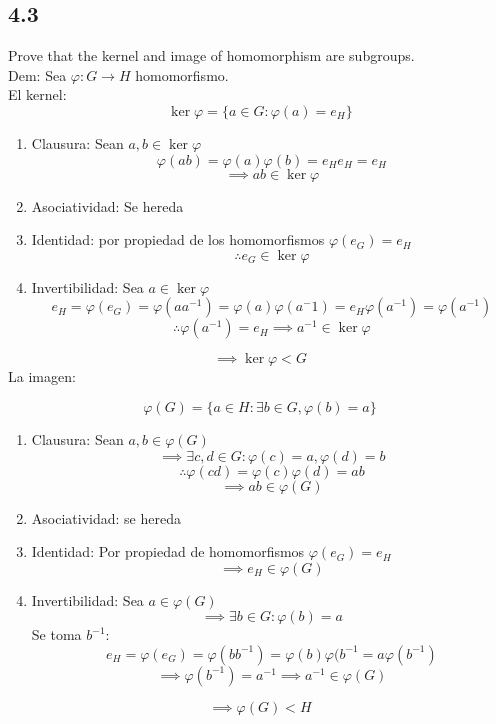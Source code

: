 \documentclass[11pt]{article}
\begin{document}
\subsection*{4.3}
Prove that the kernel and image of homomorphism are subgroups.\\
Dem: Sea $\varphi:G\rightarrow H$ homomorfismo.\\
El kernel:
\[
\ker\varphi=\{a\in G: \varphi(a)=e_H\}
\]

\begin{enumerate}
	\item Clausura: Sean $a,b\in \ker\varphi$
	\[
	\varphi(ab)=\varphi(a)\varphi(b)=e_He_H=e_H
	\]
	\[
	\implies ab\in\ker\varphi
	\]
	\item Asociatividad: Se hereda
	
	\item Identidad: por propiedad de los homomorfismos $\varphi(e_G)=e_H$
	\[
	\therefore e_G\in\ker\varphi
	\]
	
	\item Invertibilidad: Sea $a\in\ker\varphi$
	\[
	e_H=\varphi(e_G)=\varphi(aa^{-1})=\varphi(a)\varphi(a^-1)=e_H\varphi(a^{-1})=\varphi(a^{-1})
	\]
	\[
	\therefore \varphi(a^{-1})=e_H\implies a^{-1}\in\ker\varphi
	\]
\end{enumerate}

\[
\implies \ker\varphi <G
\]
La imagen:

\[
\varphi(G)=\{a\in H:\exists b\in G, \varphi(b)=a\}
\]

\begin{enumerate}
	\item Clausura: Sean $a,b\in\varphi(G)$
	\[
	\implies \exists c,d\in G:\varphi(c)=a,\varphi(d)=b
	\]
	\[
	\therefore \varphi(cd)=\varphi(c)\varphi(d)=ab
	\]
	\[
	\implies ab\in\varphi(G)
	\]
	
	\item Asociatividad: se hereda
	
	\item Identidad: Por propiedad de homomorfismos $\varphi(e_G)=e_H$
	\[
	\implies e_H\in\varphi(G)
	\]
	
	\item Invertibilidad: Sea $a\in\varphi(G)$
	\[
	\implies \exists b\in G:\varphi(b)=a
	\]
	Se toma $b^{-1}$:
	\[
	e_H=\varphi(e_G)=\varphi(bb^{-1})=\varphi(b)\varphi(b^{-1}=a\varphi(b^{-1})
	\]
	\[
	\implies \varphi(b^{-1})=a^{-1}\implies a^{-1}\in\varphi(G)
	\]
\end{enumerate}

\[
\implies \varphi(G)<H
\]
\end{document}
